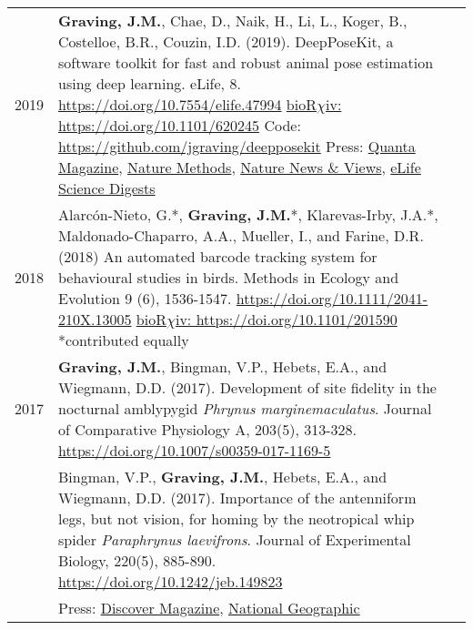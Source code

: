 \documentclass[letterpaper,7pt,oneside]{article}
\begin{document}
\begin{small}
\begin{longtable}{@{} l p{5.3in}l}
\large{2019}
 &\textbf{Graving, J.M.}, Chae, D., Naik, H., Li, L., Koger, B., Costelloe, B.R., Couzin, I.D. (2019). DeepPoseKit, a software toolkit for fast and robust animal pose estimation using deep learning. eLife, 8. \href{https://doi.org/10.7554/elife.47994}{https://doi.org/10.7554/elife.47994} \href{https://doi.org/10.1101/620245}{bioR$\chi$iv: https://doi.org/10.1101/620245} Code: \href{https://github.com/jgraving/deepposekit}{ https://github.com/jgraving/deepposekit} Press: \href{https://www.quantamagazine.org/to-decode-the-brain-scientists-automate-the-study-of-behavior-20191210/}{Quanta Magazine}, 
 \href{https://doi.org/10.1038/s41592-019-0678-2}{Nature Methods},
 \href{https://doi.org/10.1038/d41586-019-02942-5}{Nature News \& Views},
 \href{https://elifesciences.org/digests/47994/machine-learning-animal-poses-to-understand-behavior}{eLife Science Digests}
 \vspace{1mm} \\
\large{2018}
& Alarc\'{o}n-Nieto, G.*, \textbf{Graving, J.M.}*, Klarevas-Irby, J.A.*, Maldonado-Chaparro, A.A., Mueller, I., and Farine, D.R. (2018) An automated barcode tracking system for behavioural studies in birds. Methods in Ecology and Evolution 9 (6), 1536-1547. \href{https://doi.org/10.1111/2041-210X.13005}{https://doi.org/10.1111/2041-210X.13005} \href{https://doi.org/10.1101/201590}{bioR$\chi$iv: https://doi.org/10.1101/201590}  \small{*contributed equally}  \vspace{1mm} \\
\large{2017}
& \textbf{Graving, J.M.}, Bingman, V.P., Hebets, E.A., and Wiegmann, D.D. (2017). Development of site fidelity in the nocturnal amblypygid \textit{Phrynus marginemaculatus}. Journal of Comparative Physiology A, 203(5), 313-328. \href{https://doi.org/10.1007/s00359-017-1169-5}{https://doi.org/10.1007/s00359-017-1169-5} \vspace{1mm} \\
& Bingman, V.P., \textbf{Graving, J.M.}, Hebets, E.A., and Wiegmann, D.D. (2017). Importance of the antenniform legs, but not vision, for homing by the neotropical whip spider \textit{Paraphrynus laevifrons}. Journal of Experimental Biology, 220(5), 885-890.  \href{https://doi.org/10.1242/jeb.149823}{https://doi.org/10.1242/jeb.149823}\\
&Press: \href{http://blogs.discovermagazine.com/inkfish/2017/01/24/whip-spiders-use-their-feet-to-smell-their-way-home}{Discover Magazine}, 
\href{https://www.youtube.com/watch?v=eUoFegXxmfo}{National Geographic} \vspace{1mm} \\


\end{longtable}
\end{small}
\end{document}

